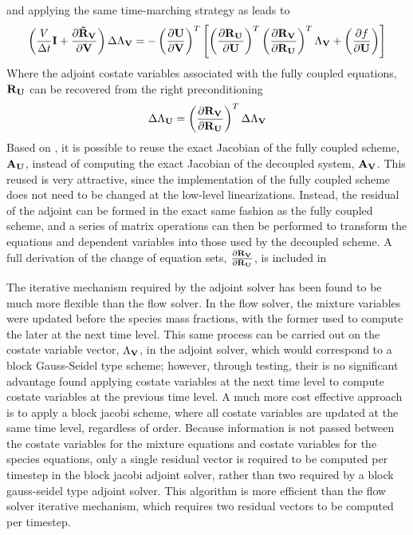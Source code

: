 and applying the same time-marching strategy as  leads to
\begin{equation}
  \left(
    \frac{V}{\Delta t} \mathbf I + \frac{\partial \mathbf{\tilde{R}_{\mathbf V}}}{\partial \mathbf V}
  \right) \Delta \Lambda_{\mathbf V}
  = -
  \left( \frac{\partial \mathbf U}{\partial \mathbf V} \right)^{T}
  \left[
    \left(\frac{\partial \mathbf R_{{\mathbf U}_{}}}{\partial \mathbf U} \right)^{T} 
    \left( \frac{\partial \mathbf R_{{\mathbf V}_{}}}{\partial \mathbf R_{{\mathbf U}_{}}} \right)^{T}
    \Lambda_{\mathbf V} 
    + \left( \frac{\partial f}{\partial \mathbf U} \right)
  \right]
  \label{adj-u-to-v-time}
\end{equation}
Where the adjoint costate variables associated with the fully coupled equations,
$\mathbf R_{{\mathbf U}_{}}$ can be recovered from the right preconditioning
\begin{equation}
  \Delta \Lambda_{\mathbf U} = \left(\frac{\partial \mathbf R_{{\mathbf V}_{}}}{\partial \mathbf R_{{\mathbf U}_{}}} \right)^{T} \Delta \Lambda_{\mathbf V}
  \label{adj-lam-v-to-u}
\end{equation}
Based on , it is possible to reuse the
exact Jacobian of the fully coupled scheme, $\mathbf A_{\mathbf U}$, instead of computing
the exact Jacobian of the decoupled system, $\mathbf A_{\mathbf V}$.  This reused is very
attractive, since the implementation of the fully coupled scheme does not need
to be changed at the low-level linearizations.  Instead, the residual of the
adjoint can be formed in the exact same fashion as the fully coupled scheme, and
a series of matrix operations can then be performed to transform the equations
and dependent variables into those used by the decoupled scheme. A full
derivation of the change of equation sets, $\frac{\partial \mathbf R_{{\mathbf V}_{}}}{\partial \mathbf R_{{\mathbf U}_{}}}$, is included
in 

The iterative mechanism required by the adjoint solver has been found to be much
more flexible than the flow solver.  In the flow solver, the mixture variables
were updated before the species mass fractions, with the former used to compute
the later at the next time level.  This same process can be carried out on the
costate variable vector, $\Lambda_{\mathbf V}$, in the adjoint solver, which would
correspond to a block Gauss-Seidel type scheme; however, through testing, their
is no significant advantage found applying costate variables at the next time
level to compute costate variables at the previous time level.  A much more cost
effective approach is to apply a block jacobi scheme, where all costate
variables are updated at the same time level, regardless of order.  Because
information is not passed between the costate variables for the mixture
equations and costate variables for the species equations, only a single
residual vector is required to be computed per timestep in the block jacobi
adjoint solver, rather than two required by a block gauss-seidel type adjoint
solver.  This algorithm is more efficient than the flow solver iterative
mechanism, which requires two residual vectors to be computed per timestep.


